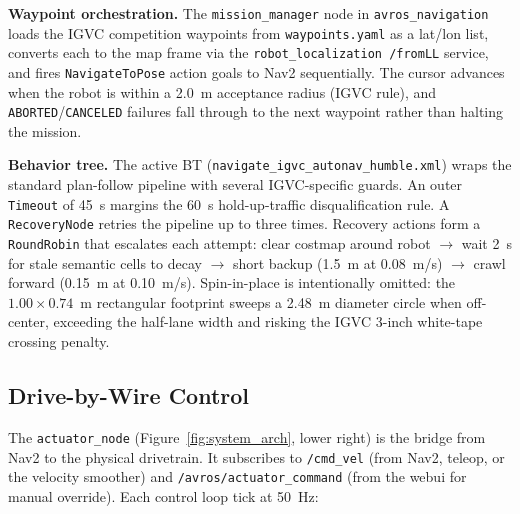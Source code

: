 \documentclass[11pt, letterpaper]{article}
\begin{document}
\textbf{Waypoint orchestration.} The \texttt{mission\_manager} node in \texttt{avros\_navigation}
loads the IGVC competition waypoints from \texttt{waypoints.yaml} as a lat/lon list, converts
each to the map frame via the \texttt{robot\_localization /fromLL} service, and fires
\texttt{NavigateToPose} action goals to Nav2 sequentially. The cursor advances when the
robot is within a 2.0~m acceptance radius (IGVC rule), and \texttt{ABORTED}/\texttt{CANCELED}
failures fall through to the next waypoint rather than halting the mission.

\textbf{Behavior tree.} The active BT (\texttt{navigate\_igvc\_autonav\_humble.xml}) wraps
the standard plan-follow pipeline with several IGVC-specific guards. An outer
\texttt{Timeout} of 45~s margins the 60~s hold-up-traffic disqualification rule. A
\texttt{RecoveryNode} retries the pipeline up to three times. Recovery actions form a
\texttt{RoundRobin} that escalates each attempt: clear costmap around robot $\to$ wait
2~s for stale semantic cells to decay $\to$ short backup (1.5~m at 0.08~m/s) $\to$ crawl
forward (0.15~m at 0.10~m/s). Spin-in-place is intentionally omitted: the
$1.00 \times 0.74$~m rectangular footprint sweeps a 2.48~m diameter circle when off-center,
exceeding the half-lane width and risking the IGVC 3-inch white-tape crossing penalty.

\subsection{Drive-by-Wire Control}
\label{sec:control}

The \texttt{actuator\_node} (Figure~\ref{fig:system_arch}, lower right) is the bridge from
Nav2 to the physical drivetrain. It subscribes to \texttt{/cmd\_vel} (from Nav2, teleop, or
the velocity smoother) and \texttt{/avros/actuator\_command} (from the webui for manual
override). Each control loop tick at 50~Hz:
\end{document}
